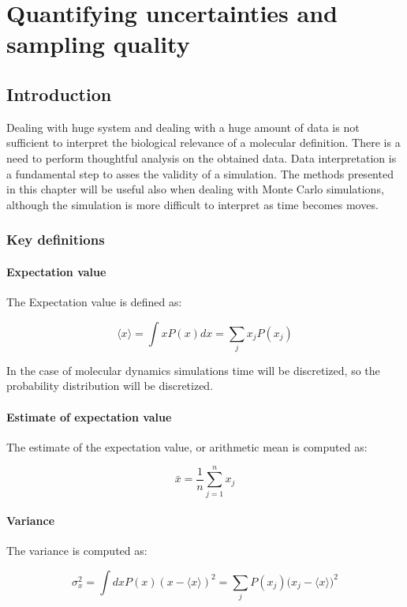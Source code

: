 \graphicspath{{chapters/14/images}}
\chapter{Quantifying uncertainties and sampling quality}

\section{Introduction}
Dealing with huge system and dealing with a huge amount of data is not sufficient to interpret the biological relevance of a molecular definition.
There is a need to perform thoughtful analysis on the obtained data.
Data interpretation is a fundamental step to asses the validity of a simulation.
The methods presented in this chapter will be useful also when dealing with Monte Carlo simulations, although the simulation is more difficult to interpret as time becomes moves.

	\subsection{Key definitions}

		\subsubsection{Expectation value}
		The Expectation value is defined as:

		$$\langle x\rangle = \int xP(x)dx = \sum\limits_jx_jP(x_j)$$

		In the case of molecular dynamics simulations time will be discretized, so the probability distribution will be discretized.

		\subsubsection{Estimate of expectation value}
		The estimate of the expectation value, or arithmetic mean is computed as:

		$$\bar{x} = \frac{1}{n}\sum\limits_{j=1}^nx_j$$

		\subsubsection{Variance}
		The variance is computed as:

		$$\sigma^2_x = \int dxP(x)(x-\langle x\rangle)^2 = \sum\limits_{j}P(x_j)\bigl(x_j-\langle x\rangle\bigr)^2$$

